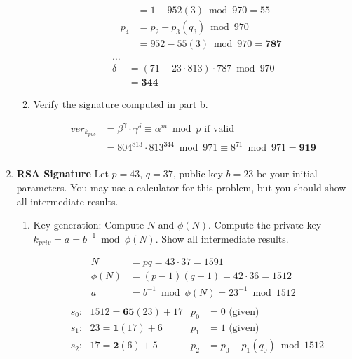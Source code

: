 \documentclass[12pt]{article}
\newenvironment{answer}
{ \begin{tcolorbox}[halign=left]
    }
    {  
  \end{tcolorbox}
}
\begin{document}
\begin{enumerate}
\begin{enumerate}
\begin{answer}
\begin{align*}
        & & &= 1 - 952(3) \bmod 970 = 55 \\
        & &p_4 &= p_2 - p_3(q_3) \bmod 970 \\ 
        & & &= 952 - 55(3) \bmod 970 = \bm{787} \\
      \end{align*}
      \begin{align*}
        \ldots & \\
        \delta &= (71 - 23\cdot 813) \cdot 787 \bmod 970 \\
               &= \bm{344}
      \end{align*}
    \end{answer}
    \newpage
  \item Verify the signature computed in part b.
    \begin{answer}
      \begin{align*}
        ver_{k_{pub}} &= \beta^{\gamma} \cdot \gamma^{\delta} \equiv \alpha^{m} \bmod p \text{ if valid} \\
                     &= 804^{813} \cdot 813^{344} \bmod 971 \equiv 8^{71} \bmod 971 = \bm{919} \\
      \end{align*}
    \end{answer}
  \end{enumerate}
\newpage
\item \textbf{RSA Signature} Let $p = 43$, $q = 37$, public key $b = 23$ be your initial parameters.
  You may use a calculator for this problem, but you should show all intermediate results.
  \begin{enumerate}
  \item Key generation: Compute $N$ and $\phi(N)$. Compute the private key $k_{priv} = a = b^{-1} \bmod \phi(N)$. Show all intermediate results.
    \begin{answer}
      \begin{align*}
        N &= pq = 43\cdot37 = 1591 \\
        \phi(N) &= (p-1)(q-1) = 42\cdot36 = 1512 \\
        a &= b^{-1} \bmod \phi(N) = 23^{-1} \bmod 1512 \\
      \end{align*}
      \begin{align*}
          &s_0: \text{  }1512 = \bm{65}(23) + 17 &p_0 &= 0 \text{ (given)}\\
          &s_1: \text{  }23 = \bm{1}(17) + 6 &p_1 &= 1 \text{ (given)}\\
          &s_2: \text{  }17 = \bm{2}(6) + 5 &p_2 &= p_0 - p_1(q_0) \bmod 1512 \\ 

\end{align*}
\end{answer}
\end{enumerate}
\end{enumerate}
\end{document}
